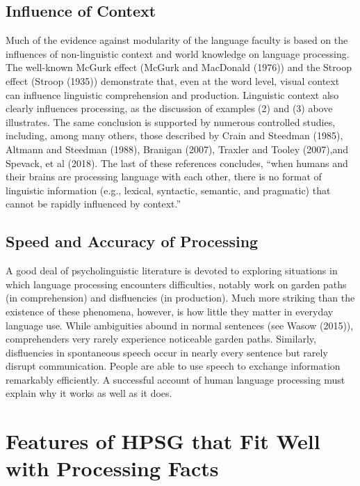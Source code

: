 \documentclass[a4paper]{article}
\begin{document}
\subsection{Influence of Context}

Much of the evidence against modularity of the language faculty is based on the influences of non-linguistic context and world knowledge on language processing.  The well-known McGurk effect (McGurk and MacDonald (1976)) and the Stroop effect (Stroop (1935)) demonstrate that, even at the word level, visual context can influence linguistic comprehension and production.
\newline
\newline
Linguistic context also clearly influences processing, as the discussion of examples (2) and (3) above illustrates.  The same conclusion is supported by numerous controlled studies, including, among many others, those described by Crain and Steedman (1985), Altmann and Steedman (1988), Branigan (2007), Traxler and Tooley (2007),and Spevack, et al (2018).  The last of these references concludes, ``when humans and their brains are processing language with each other, there is no format
of linguistic information (e.g., lexical, syntactic, semantic, and pragmatic) that cannot be rapidly
influenced by context.''

\subsection{Speed and Accuracy of Processing}

A good deal of psycholinguistic literature is devoted to exploring situations in which language processing encounters difficulties, notably work on garden paths (in comprehension) and disfluencies (in production).  Much more striking than the existence of these phenomena, however, is how little they matter in everyday language use.  While ambiguities abound in normal sentences (see Wasow (2015)), comprehenders very rarely experience noticeable garden paths.  Similarly, disfluencies in spontaneous speech occur in nearly every sentence but rarely disrupt communication.  
\newline
\newline
People are able to use speech to exchange information remarkably efficiently.  A successful account of human language processing must explain why it works as well as it does.  

\section{Features of HPSG that Fit Well with Processing Facts}
\end{document}

